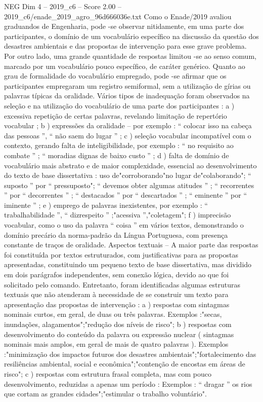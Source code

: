 \begin{textsample}{NEG Dim 4 – 2019\_c6 – Score 2.00 – 2019\_c6/enade\_2019\_agro\_96d666036e.txt}
Como o Enade/2019 avaliou graduandos de Engenharia, pode -se observar nitidamente, em uma parte dos participantes, o domínio de um vocabulário específico na discussão da questão dos desastres ambientais e das propostas de intervenção para esse grave problema.
Por outro lado, uma grande quantidade de respostas limitou -se ao senso comum, marcado por um vocabulário pouco específico, de caráter genérico.
Quanto ao grau de formalidade do vocabulário empregado, pode -se afirmar que os participantes empregaram um registro semiformal, sem a utilização de gírias ou palavras típicas da oralidade.
Vários tipos de inadequação foram observados na seleção e na utilização do vocabulário de uma parte dos participantes : a ) excessiva repetição de certas palavras, revelando limitação de repertório vocabular ; b ) expressões da oralidade – por exemplo : “ colocar isso na cabeça das pessoas ”, “ não saem do lugar ” ; c ) seleção vocabular incompatível com o contexto, gerando falta de inteligibilidade, por exemplo : “ no requisito ao combate ” ; “ moradias dignas de baixo custo ” ; d ) falta de domínio de vocabulário mais abstrato e de maior complexidade, essencial ao desenvolvimento do texto de base dissertativa : uso de"corroborando"no lugar de"colaborando"; “ suposto ” por “ pressuposto"; “ devemos obter algumas atitudes ” ; “ recorrentes ” por “ decorrentes ” ; “ destacados ” por “ descartados ” ; “ eminente ” por “ iminente ” ; e ) emprego de palavras inexistentes, por exemplo : “ trabalhabilidade ”, “ dizrespeito ” ;"acessiva ”,"coletagem"; f ) imprecisão vocabular, como o uso da palavra “ coisa ” em vários textos, demonstrando o domínio precário da norma-padrão da Língua Portuguesa, com presença constante de traços de oralidade.
Aspectos textuais – A maior parte das respostas foi constituída por textos estruturados, com justificativas para as propostas apresentadas, constituindo um pequeno texto de base dissertativa, mas dividido em dois parágrafos independentes, sem conexão lógica, devido ao que foi solicitado pelo comando.
Entretanto, foram identificadas algumas estruturas textuais que não atenderam à necessidade de se construir um texto para apresentação das propostas de intervenção : a ) respostas com sintagmas nominais curtos, em geral, de duas ou três palavras.
Exemplos :"secas, inundações, alagamentos";"redução dos níveis de risco"; b ) respostas com desenvolvimento do conteúdo da palavra ou expressão nuclear ( sintagmas nominais mais amplos, em geral de mais de quatro palavras ).
Exemplos :"minimização dos impactos futuros dos desastres ambientais";"fortalecimento das resiliências ambiental, social e econômica";"contenção de encostas em áreas de risco"; c ) respostas com estrutura frasal completa, mas com pouco desenvolvimento, reduzidas a apenas um período : Exemplos : “ dragar ” os rios que cortam as grandes cidades";"estimular o trabalho voluntário".

\end{textsample}
